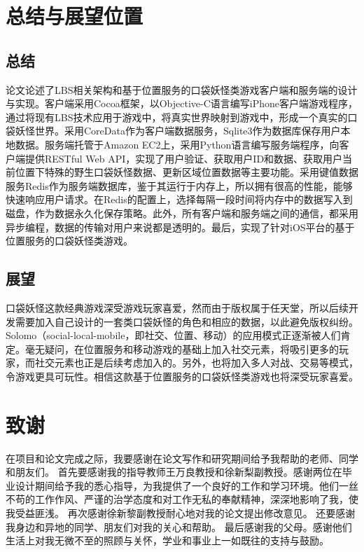 \documentclass{article}
\begin{document}
\begin{CJK}{UTF8}{gbsn}
  \section{总结与展望位置}
  \subsection{总结}
  论文论述了LBS相关架构和基于位置服务的口袋妖怪类游戏客户端和服务端的设计与实现。客户端采用Cocoa框架，以Objective-C语言编写iPhone客户端游戏程序，通过将现有LBS技术应用于游戏中，将真实世界映射到游戏中，形成一个真实的口袋妖怪世界。采用CoreData作为客户端数据服务，Sqlite3作为数据库保存用户本地数据。服务端托管于Amazon EC2上，采用Python语言编写服务端程序，向客户端提供RESTful Web API，实现了用户验证、获取用户ID和数据、获取用户当前位置下特殊的野生口袋妖怪数据、更新区域位置数据等主要功能。采用键值数据服务Redis作为服务端数据库，鉴于其运行于内存上，所以拥有很高的性能，能够快速响应用户请求。在Redis的配置上，选择每隔一段时间将内存中的数据写入到磁盘，作为数据永久化保存策略。此外，所有客户端和服务端之间的通信，都采用异步编程，数据的传输对用户来说都是透明的。最后，实现了针对iOS平台的基于位置服务的口袋妖怪类游戏。

	\subsection{展望}
  口袋妖怪这款经典游戏深受游戏玩家喜爱，然而由于版权属于任天堂，所以后续开发需要加入自己设计的一套类口袋妖怪的角色和相应的数据，以此避免版权纠纷。Solomo（social-local-mobile，即社交、位置、移动）的应用模式正逐渐被人们肯定。毫无疑问，在位置服务和移动游戏的基础上加入社交元素，将吸引更多的玩家，而社交元素也正是后续考虑加入的。另外，也将加入多人对战、交易等模式，令游戏更具可玩性。相信这款基于位置服务的口袋妖怪类游戏也将深受玩家喜爱。


	\section{致谢}
  在项目和论文完成之际，我要感谢在论文写作和研究期间给予我帮助的老师、同学和朋友们。
  首先要感谢我的指导教师王万良教授和徐新梨副教授。感谢两位在毕业设计期间给予我的悉心指导，为我提供了一个良好的工作和学习环境。他们一丝不苟的工作作风、严谨的治学态度和对工作无私的奉献精神，深深地影响了我，使我受益匪浅。
  再次感谢徐新黎副教授耐心地对我的论文提出修改意见。
  还要感谢我身边和异地的同学、朋友们对我的关心和帮助。
  最后感谢我的父母。感谢他们生活上对我无微不至的照顾与关怀，学业和事业上一如既往的支持与鼓励。
  

  

	\end{CJK}
\end{document}

